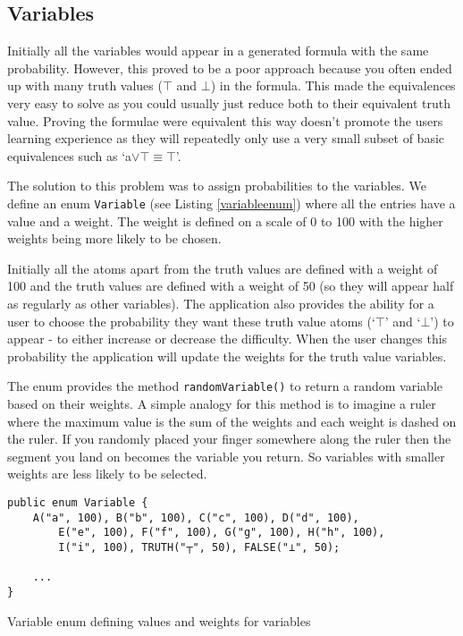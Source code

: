 \documentclass{report}
\begin{document}
\subsection{Variables}
\label{sub:variables}

Initially all the variables would appear in a generated formula with the same probability. However, this proved to be a poor approach because you often ended up with many truth values ($\top$ and $\bot$) in the formula. This made the equivalences very easy to solve as you could usually just reduce both to their equivalent truth value. Proving the formulae were equivalent this way doesn't promote the users learning experience as they will repeatedly only use a very small subset of basic equivalences such as `a$\lor\top \equiv \top$'.

The solution to this problem was to assign probabilities to the variables. We define an enum {\tt Variable} (see Listing \ref{variableenum}) where all the entries have a value and a weight. The weight is defined on a scale of 0 to 100 with the higher weights being more likely to be chosen.

Initially all the atoms apart from the truth values are defined with a weight of 100 and the truth values are defined with a weight of 50 (so they will appear half as regularly as other variables). The application also provides the ability for a user to choose the probability they want these truth value atoms (`$\top$' and `$\bot$') to appear - to either increase or decrease the difficulty. When the user changes this probability the application will update the weights for the truth value variables.

The enum provides the method {\tt randomVariable()} to return a random variable based on their weights. A simple analogy for this method is to imagine a ruler where the maximum value is the sum of the weights and each weight is dashed on the ruler. If you randomly placed your finger somewhere along the ruler then the segment you land on becomes the variable you return. So variables with smaller weights are less likely to be selected.

\begin{listing}[ht]
\begin{verbatim}
public enum Variable {
    A("a", 100), B("b", 100), C("c", 100), D("d", 100), 
        E("e", 100), F("f", 100), G("g", 100), H("h", 100), 
        I("i", 100), TRUTH("┬", 50), FALSE("⊥", 50);

    ...
}
\end{verbatim}
\caption{Variable enum defining values and weights for variables}
\label{variableenum}
\end{listing}
\end{document}
